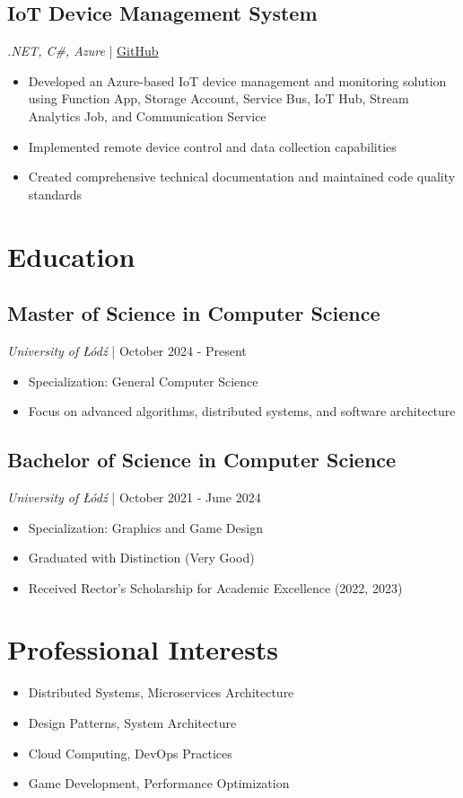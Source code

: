 \documentclass[a4paper,10pt]{article}
\begin{document}
\subsection{IoT Device Management System}
\textit{.NET, C\#, Azure} | \href{https://github.com/ZDSDD/IoT_OpcAgent}{GitHub}
\begin{itemize}[leftmargin=0.5cm, nosep]
    \item Developed an Azure-based IoT device management and monitoring solution using Function App, Storage Account, Service Bus, IoT Hub, Stream Analytics Job, and Communication Service
    \item Implemented remote device control and data collection capabilities
    \item Created comprehensive technical documentation and maintained code quality standards
\end{itemize}


\section{Education}

\subsection{Master of Science in Computer Science}
\textit{University of Łódź} | October 2024 - Present
\begin{itemize}[leftmargin=0.5cm, nosep]
    \item Specialization: General Computer Science
    \item Focus on advanced algorithms, distributed systems, and software architecture
\end{itemize}

\subsection{Bachelor of Science in Computer Science}
\textit{University of Łódź} | October 2021 - June 2024
\begin{itemize}[leftmargin=0.5cm, nosep]
    \item Specialization: Graphics and Game Design
    \item Graduated with Distinction (Very Good)
    \item Received Rector's Scholarship for Academic Excellence (2022, 2023)
\end{itemize}

\section{Professional Interests}
\begin{itemize}[leftmargin=0.5cm, nosep]
    \item Distributed Systems, Microservices Architecture
    \item Design Patterns, System Architecture
    \item Cloud Computing, DevOps Practices
    \item Game Development, Performance Optimization
\end{itemize}
\end{document}
